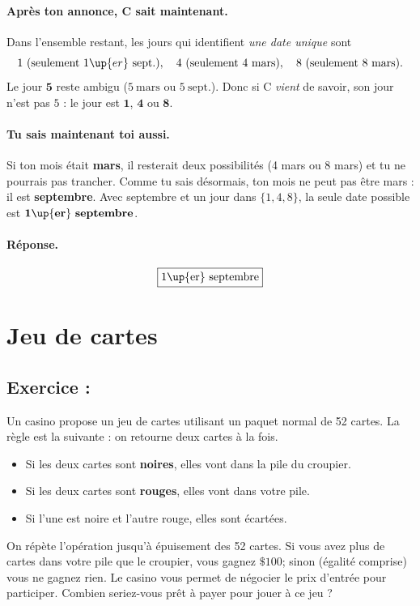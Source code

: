 \paragraph{Après ton annonce, C sait maintenant.}
Dans l’ensemble restant, les jours qui identifient \emph{une date unique} sont
\[
1 \ (\text{seulement } 1\up{er}~\text{sept.}),\quad
4 \ (\text{seulement } 4~\text{mars}),\quad
8 \ (\text{seulement } 8~\text{mars}).
\]
Le jour \(\mathbf{5}\) reste ambigu (\(5~\text{mars}\) ou \(5~\text{sept.}\)).
Donc si C \emph{vient} de savoir, son jour n’est pas \(5\) : le jour est \(\mathbf{1}\), \(\mathbf{4}\) ou \(\mathbf{8}\).

\paragraph{Tu sais maintenant toi aussi.}
Si ton mois était \textbf{mars}, il resterait deux possibilités (4 mars ou 8 mars) et tu ne pourrais pas trancher.
Comme tu sais désormais, ton mois ne peut pas être mars : il est \textbf{septembre}.
Avec septembre et un jour dans \(\{1,4,8\}\), la seule date possible est \(\mathbf{1\up{er}~septembre}\).

\paragraph{Réponse.}
\[
\boxed{\text{1\up{er} septembre}}
\]





\section{Jeu de cartes}

\subsection*{Exercice :}

\begin{exerciseBox}
Un casino propose un jeu de cartes utilisant un paquet normal de 52 cartes.
La règle est la suivante : on retourne deux cartes à la fois.
\begin{itemize}
    \item Si les deux cartes sont \textbf{noires}, elles vont dans la pile du croupier.
    \item Si les deux cartes sont \textbf{rouges}, elles vont dans votre pile.
    \item Si l’une est noire et l’autre rouge, elles sont écartées.
\end{itemize}
On répète l’opération jusqu’à épuisement des 52 cartes.  
Si vous avez plus de cartes dans votre pile que le croupier, vous gagnez \(\$100\); sinon (égalité comprise) vous ne gagnez rien.  
Le casino vous permet de négocier le prix d’entrée pour participer.  
Combien seriez-vous prêt à payer pour jouer à ce jeu ?
    
\end{exerciseBox}

